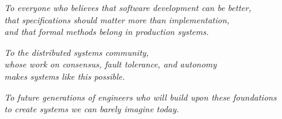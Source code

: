 \begin{center}
    \itshape
    To everyone who believes that software development can be better,\\
    that specifications should matter more than implementation,\\
    and that formal methods belong in production systems.
\end{center}

\vspace{1cm}

\begin{center}
    \itshape
    To the distributed systems community,\\
    whose work on consensus, fault tolerance, and autonomy\\
    makes systems like this possible.
\end{center}

\vspace{1cm}

\begin{center}
    \itshape
    To future generations of engineers who will build upon these foundations\\
    to create systems we can barely imagine today.
\end{center}
